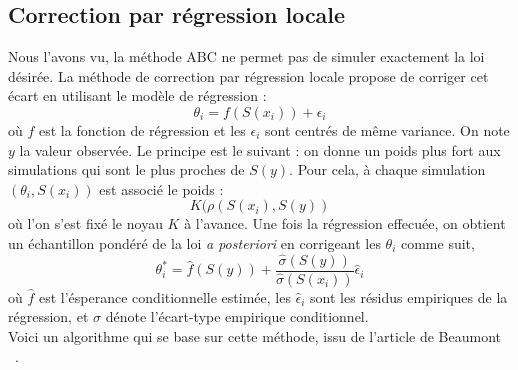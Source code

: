 \documentclass{article}
\theoremstyle{definition}
\begin{document}
\subsection{Correction par régression locale}
 Nous l'avons vu, la méthode ABC ne permet pas de simuler exactement la loi désirée. La méthode de correction par régression locale propose de corriger cet écart en utilisant le modèle de régression :
\[\theta_i=f(S(x_i))+\epsilon_i\]
où $f$ est la fonction de régression et les $\epsilon_i$ sont centrés de même variance. On note $y$ la valeur observée. Le principe est le suivant : on donne un poids plus fort aux simulations qui sont le plus proches de $S(y)$. Pour cela, à chaque simulation $(\theta_i,S(x_i))$ est associé le poids :
\[K(\rho(S(x_i),S(y))\] 
où l'on s'est fixé le noyau $K$ à l'avance. Une fois la régression effecuée, on obtient un échantillon pondéré de la loi \textit{a posteriori} en corrigeant les $\theta_i$ comme suit,
\[\theta^*_i=\hat f(S(y))+\frac{\hat\sigma(S(y))}{\hat\sigma(S(x_i))}\hat\epsilon_i\]
où $\hat f$ est l'ésperance conditionnelle estimée, les $\hat\epsilon_i$ sont les résidus empiriques de la régression, et $\hat\sigma$ dénote l'écart-type empirique conditionnel.\\

 Voici un algorithme qui se base sur cette méthode, issu de l'article de Beaumont ~\cite{Beaumont}.
\\

\\
\\
\end{document}
